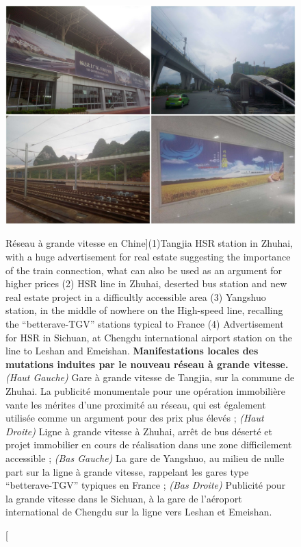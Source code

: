 \begin{figure}
	\includegraphics[width=\linewidth]{Figures/Final/1-3-1-fig-qualitative-hsr}
	\caption[][Réseau à grande vitesse en Chine]{(1)Tangjia HSR station in Zhuhai, with a huge advertisement for real estate suggesting the importance of the train connection, what can also be used as an argument for higher prices  (2) HSR line in Zhuhai, deserted bus station and new real estate project in a difficultly accessible area  (3) Yangshuo station, in the middle of nowhere on the High-speed line, recalling the “betterave-TGV” stations typical to France (4) Advertisement for HSR in Sichuan, at Chengdu international airport station on the line to Leshan and Emeishan. \label{fig:qualitative:hsr}}{\textbf{Manifestations locales des mutations induites par le nouveau réseau à grande vitesse.} \textit{(Haut Gauche)} Gare à grande vitesse de Tangjia, sur la commune de Zhuhai. La publicité monumentale pour une opération immobilière vante les mérites d'une proximité au réseau, qui est également utilisée comme un argument pour des prix plus élevés ; \textit{(Haut Droite)} Ligne à grande vitesse à Zhuhai, arrêt de bus déserté et projet immobilier en cours de réalisation dans une zone difficilement accessible ; \textit{(Bas Gauche)} La gare de Yangshuo, au milieu de nulle part  sur la ligne à grande vitesse, rappelant les gares type ``betterave-TGV'' typiques en France ; \textit{(Bas Droite)} Publicité pour la grande vitesse dans le Sichuan, à la gare de l'aéroport international de Chengdu sur la ligne vers Leshan et Emeishan.\label{fig:qualitative:hsr}}
\end{figure}






